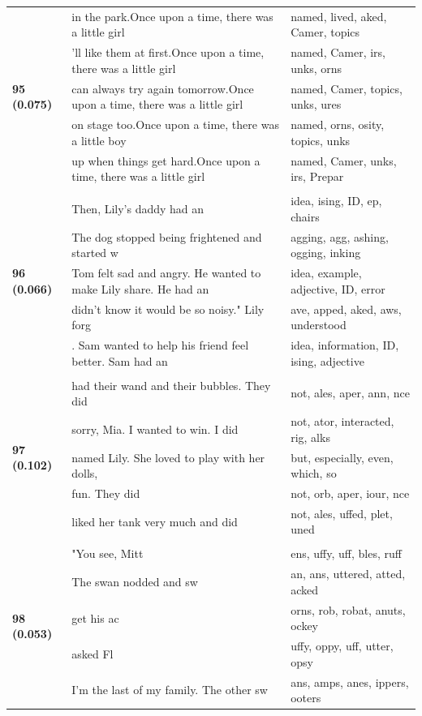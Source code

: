 \documentclass{article}
\theoremstyle{plain}
\theoremstyle{definition}
\theoremstyle{remark}
\begin{document}
\begin{longtable}{|p{}|p{}|p{}|}
\multirow{5}{*}{\textbf{95 (0.075)}} & in the park.Once upon a time, there was a little girl & named,  lived, aked,  Camer,  topics \\
& 'll like them at first.Once upon a time, there was a little girl & named,  Camer, irs, unks, orns \\
& can always try again tomorrow.Once upon a time, there was a little girl & named,  Camer,  topics, unks, ures \\
& on stage too.Once upon a time, there was a little boy & named, orns, osity,  topics, unks \\
& up when things get hard.Once upon a time, there was a little girl & named,  Camer, unks, irs,  Prepar \\
& & \\
\multirow{5}{*}{\textbf{96 (0.066)}} & Then, Lily's daddy had an & idea, ising,  ID,  ep,  chairs \\
& The dog stopped being frightened and started w & agging, agg, ashing, ogging, inking \\
& Tom felt sad and angry. He wanted to make Lily share. He had an & idea,  example,  adjective,  ID,  error \\
& didn't know it would be so noisy." Lily forg & ave, apped, aked, aws,  understood \\
& . Sam wanted to help his friend feel better.  Sam had an & idea,  information,  ID, ising,  adjective \\
& & \\
\multirow{5}{*}{\textbf{97 (0.102)}} & had their wand and their bubbles. They did & not, ales, aper, ann, nce \\
& sorry, Mia. I wanted to win. I did & not, ator,  interacted, rig, alks \\
& named Lily. She loved to play with her dolls, & but,  especially,  even,  which,  so \\
& fun. They did & not,  orb, aper, iour, nce \\
& liked her tank very much and did & not, ales, uffed, plet, uned \\
& & \\
\multirow{5}{*}{\textbf{98 (0.053)}} & "You see, Mitt & ens, uffy, uff, bles, ruff \\
& The swan nodded and sw & an, ans, uttered, atted, acked \\
& get his ac & orns, rob, robat, anuts, ockey \\
& asked Fl & uffy, oppy, uff, utter, opsy \\
& I'm the last of my family. The other sw & ans, amps, anes, ippers, ooters \\

\end{longtable}
\end{document}
